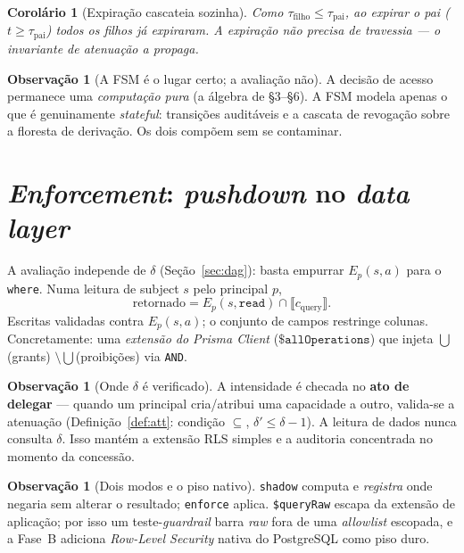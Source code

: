 \documentclass[11pt,a4paper]{article}
\newtheorem{corollary}[theorem]{Corolário}
\theoremstyle{definition}
\newtheorem{remark}[theorem]{Observação}
\newcommand{\ext}[1]{\llbracket #1 \rrbracket}
\newcommand{\dep}{\delta}
\begin{document}
\begin{corollary}[Expiração cascateia sozinha]
Como $\tau_{\text{filho}}\le\tau_{\text{pai}}$, ao expirar o pai
($t\ge\tau_{\text{pai}}$) todos os filhos já expiraram. A expiração não
precisa de travessia --- o invariante de atenuação a propaga.
\end{corollary}

\begin{remark}[A FSM é o lugar certo; a avaliação não]
A decisão de acesso permanece uma \emph{computação pura} (a álgebra de §3--§6).
A FSM modela apenas o que é genuinamente \emph{stateful}: transições
auditáveis e a cascata de revogação sobre a floresta de derivação. Os dois compõem sem se
contaminar.
\end{remark}

\section{\emph{Enforcement}: \emph{pushdown} no \emph{data layer}}\label{sec:enf}

A avaliação independe de $\dep$ (Seção~\ref{sec:dag}): basta empurrar
$E_p(s,a)$ para o \texttt{where}. Numa leitura de subject $s$ pelo principal
$p$,
\[
  \text{retornado}=E_p(s,\texttt{read})\cap\ext{c_{\text{query}}} .
\]
Escritas validadas contra $E_p(s,a)$; o conjunto de campos restringe colunas.
Concretamente: uma \emph{extensão do Prisma Client} ($\texttt{\$allOperations}$)
que injeta $\bigcup$(grants) $\setminus\bigcup$(proibições) via \texttt{AND}.

\begin{remark}[Onde $\dep$ é verificado]
A intensidade é checada no \textbf{ato de delegar} --- quando um principal
cria/atribui uma capacidade a outro, valida-se a atenuação
(Definição~\ref{def:att}: condição $\subseteq$, $\dep'\le\dep-1$). A leitura
de dados nunca consulta $\dep$. Isso mantém a extensão RLS simples e a
auditoria concentrada no momento da concessão.
\end{remark}

\begin{remark}[Dois modos e o piso nativo]
\texttt{shadow} computa e \emph{registra} onde negaria sem alterar o
resultado; \texttt{enforce} aplica. \texttt{\$queryRaw} escapa da extensão de
aplicação; por isso um teste-\emph{guardrail} barra \emph{raw} fora de uma
\emph{allowlist} escopada, e a Fase~B adiciona \emph{Row-Level Security}
nativa do PostgreSQL como piso duro.
\end{remark}
\end{document}
